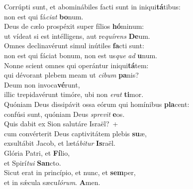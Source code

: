 \evenverse Corrúpti sunt, et abominábiles facti sunt in iniqui\textbf{tá}tibus:~\*\\
\evenverse non est qui fá\textit{ci}\textit{at} \textbf{bo}num.\\
\oddverse Deus de cælo prospéxit super fílios \textbf{hó}minum:~\*\\
\oddverse ut vídeat si est intélligens, aut re\textit{quí}\textit{rens} \textbf{De}um.\\
\evenverse Omnes declinavérunt simul inútiles \textbf{fa}cti sunt:~\*\\
\evenverse non est qui fáciat bonum, non est us\textit{que} \textit{ad} \textbf{u}num.\\
\oddverse Nonne scient omnes qui operántur iniqui\textbf{tá}tem:~\*\\
\oddverse qui dévorant plebem meam ut \textit{ci}\textit{bum} \textbf{pa}nis?\\
\evenverse Deum non invoca\textbf{vé}runt,~\*\\
\evenverse illic trepidavérunt timóre, ubi non \textit{e}\textit{rat} \textbf{ti}mor.\\
\oddverse Quóniam Deus dissipávit ossa eórum qui homínibus \textbf{pla}cent:~\*\\
\oddverse confúsi sunt, quóniam Deus \textit{spre}\textit{vit} \textbf{e}os.\\
\evenverse Quis dabit ex Sion salutáre Israël?~+\\
\evenverse  cum convérterit Deus captivitátem plebis \textbf{su}æ,~\*\\
\evenverse exsultábit Jacob, et lætá\textit{bi}\textit{tur} \textbf{Is}raël.\\
\oddverse Glória Patri, et \textbf{Fí}lio,~\*\\
\oddverse et Spirí\textit{tu}\textit{i} \textbf{San}cto.\\
\evenverse Sicut erat in princípio, et nunc, et \textbf{sem}per,~\*\\
\evenverse et in sǽcula sæcu\textit{ló}\textit{rum}. \textbf{A}men.\\
